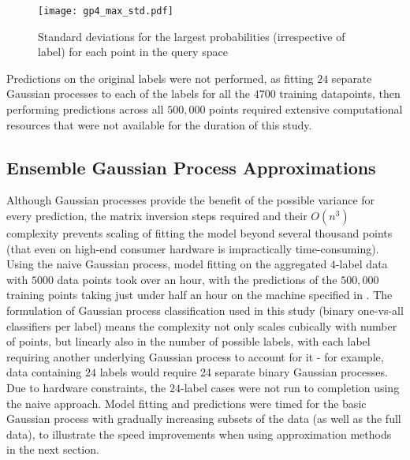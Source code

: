 \begin{figure}
    \centerline{\texttt{[image: gp4\_max\_std.pdf]}}
    \caption{Standard deviations for the largest probabilities (irrespective of label) for each point in the query space}
    \label{fig:gp4_vars}
\end{figure}


Predictions on the original labels were not performed, as fitting $24$ separate Gaussian processes to each of the labels for all the $4700$ training datapoints, then performing predictions across all $500,000$ points required extensive computational resources that were not available for the duration of this study.

\subsection{Ensemble Gaussian Process Approximations}

Although Gaussian processes provide the benefit of the possible variance for every prediction, the matrix inversion steps required and their $O(n^3)$ complexity prevents scaling of fitting the model beyond several thousand points (that even on high-end consumer hardware is impractically time-consuming). Using the naive Gaussian process, model fitting on the aggregated $4$-label data with $5000$ data points took over an hour, with the predictions of the $500,000$ training points taking just under half an hour on the machine specified in . The formulation of Gaussian process classification used in this study (binary one-vs-all classifiers per label) means the complexity not only scales cubically with number of points, but linearly also in the number of possible labels, with each label requiring another underlying Gaussian process to account for it - for example, data containing $24$ labels would require 24 separate binary Gaussian processes. Due to hardware constraints, the $24$-label cases were not run to completion using the naive approach. Model fitting and predictions were timed for the basic Gaussian process with gradually increasing subsets of the data (as well as the full data), to illustrate the speed improvements when using approximation methods in the next section.

